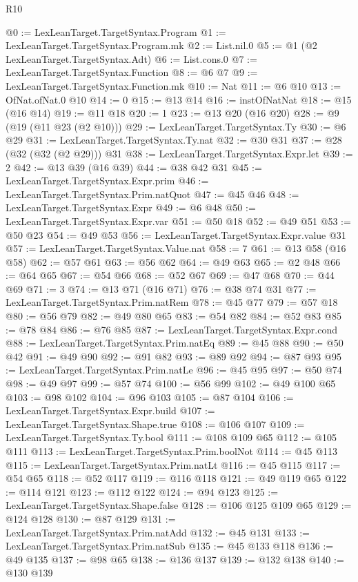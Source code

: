 \begin{lexlean}{R10}
\begin{coremodule}
@0 := LexLeanTarget.TargetSyntax.Program
@1 := LexLeanTarget.TargetSyntax.Program.mk
@2 := List.nil.{0}
@5 := @1 (@2 LexLeanTarget.TargetSyntax.Adt)
@6 := List.cons.{0}
@7 := LexLeanTarget.TargetSyntax.Function
@8 := @6 @7
@9 := LexLeanTarget.TargetSyntax.Function.mk
@10 := Nat
@11 := @6 @10
@13 := OfNat.ofNat.{0} @10
@14 := 0
@15 := @13 @14
@16 := instOfNatNat
@18 := @15 (@16 @14)
@19 := @11 @18
@20 := 1
@23 := @13 @20 (@16 @20)
@28 := @9 (@19 (@11 @23 (@2 @10)))
@29 := LexLeanTarget.TargetSyntax.Ty
@30 := @6 @29
@31 := LexLeanTarget.TargetSyntax.Ty.nat
@32 := @30 @31
@37 := @28 (@32 (@32 (@2 @29))) @31
@38 := LexLeanTarget.TargetSyntax.Expr.let
@39 := 2
@42 := @13 @39 (@16 @39)
@44 := @38 @42 @31
@45 := LexLeanTarget.TargetSyntax.Expr.prim
@46 := LexLeanTarget.TargetSyntax.Prim.natQuot
@47 := @45 @46
@48 := LexLeanTarget.TargetSyntax.Expr
@49 := @6 @48
@50 := LexLeanTarget.TargetSyntax.Expr.var
@51 := @50 @18
@52 := @49 @51
@53 := @50 @23
@54 := @49 @53
@56 := LexLeanTarget.TargetSyntax.Expr.value @31
@57 := LexLeanTarget.TargetSyntax.Value.nat
@58 := 7
@61 := @13 @58 (@16 @58)
@62 := @57 @61
@63 := @56 @62
@64 := @49 @63
@65 := @2 @48
@66 := @64 @65
@67 := @54 @66
@68 := @52 @67
@69 := @47 @68
@70 := @44 @69
@71 := 3
@74 := @13 @71 (@16 @71)
@76 := @38 @74 @31
@77 := LexLeanTarget.TargetSyntax.Prim.natRem
@78 := @45 @77
@79 := @57 @18
@80 := @56 @79
@82 := @49 @80 @65
@83 := @54 @82
@84 := @52 @83
@85 := @78 @84
@86 := @76 @85
@87 := LexLeanTarget.TargetSyntax.Expr.cond
@88 := LexLeanTarget.TargetSyntax.Prim.natEq
@89 := @45 @88
@90 := @50 @42
@91 := @49 @90
@92 := @91 @82
@93 := @89 @92
@94 := @87 @93
@95 := LexLeanTarget.TargetSyntax.Prim.natLe
@96 := @45 @95
@97 := @50 @74
@98 := @49 @97
@99 := @57 @74
@100 := @56 @99
@102 := @49 @100 @65
@103 := @98 @102
@104 := @96 @103
@105 := @87 @104
@106 := LexLeanTarget.TargetSyntax.Expr.build
@107 := LexLeanTarget.TargetSyntax.Shape.true
@108 := @106 @107
@109 := LexLeanTarget.TargetSyntax.Ty.bool
@111 := @108 @109 @65
@112 := @105 @111
@113 := LexLeanTarget.TargetSyntax.Prim.boolNot
@114 := @45 @113
@115 := LexLeanTarget.TargetSyntax.Prim.natLt
@116 := @45 @115
@117 := @54 @65
@118 := @52 @117
@119 := @116 @118
@121 := @49 @119 @65
@122 := @114 @121
@123 := @112 @122
@124 := @94 @123
@125 := LexLeanTarget.TargetSyntax.Shape.false
@128 := @106 @125 @109 @65
@129 := @124 @128
@130 := @87 @129
@131 := LexLeanTarget.TargetSyntax.Prim.natAdd
@132 := @45 @131
@133 := LexLeanTarget.TargetSyntax.Prim.natSub
@135 := @45 @133 @118
@136 := @49 @135
@137 := @98 @65
@138 := @136 @137
@139 := @132 @138
@140 := @130 @139

\end{coremodule}
\end{lexlean}

